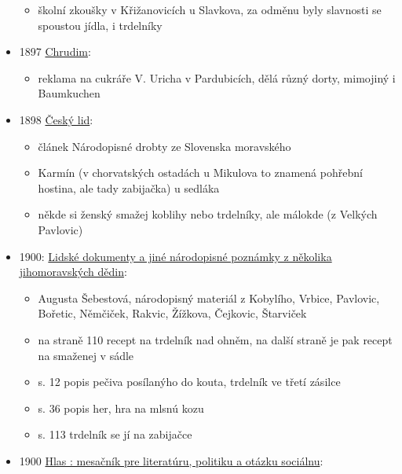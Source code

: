 \begin{itemize}
  \begin{itemize}
  \tightlist
  \item
    školní zkoušky v Křižanovicích u Slavkova, za odměnu byly slavnosti
    se spoustou jídla, i trdelníky
  \end{itemize}
\item
  1897
  \href{https://ceskadigitalniknihovna.cz/uuid/uuid:c3a426e0-2b81-11e7-a77b-001018b5eb5c}{Chrudim}:

  \begin{itemize}
  \tightlist
  \item
    reklama na cukráře V. Uricha v Pardubicích, dělá různý dorty,
    mimojiný i Baumkuchen
  \end{itemize}
\item
  1898
  \href{https://ceskadigitalniknihovna.cz/view/uuid:38bef4ba-03a2-433c-a4ed-a9914d68b1a5?page=uuid\%3A5c5ae01f-9a43-4111-b72b-1cfe6710f70a&fulltext=trdeln\%C3\%ADk\%20OR\%20trdeln\%C3\%ADky\%20OR\%20trdeln\%C3\%ADk\%C5\%AF&source=knav}{Český
  lid}:

  \begin{itemize}
  \tightlist
  \item
    článek Národopisné drobty ze Slovenska moravského
  \item
    Karmín (v chorvatských ostadách u Mikulova to znamená pohřební
    hostina, ale tady zabijačka) u sedláka
  \item
    někde si ženský smažej koblihy nebo trdelníky, ale málokde (z
    Velkých Pavlovic)
  \end{itemize}
\item
  1900:
  \href{https://ndk.cz/view/uuid:7d517d10-0583-11dd-85d4-000d606f5dc6?page=uuid\%3A445fd636-253c-4b04-b533-3b0a96e7e0b4}{
  Lidské dokumenty a jiné národopisné poznámky z několika jihomoravských
  dědin}:

  \begin{itemize}
  \tightlist
  \item
    Augusta Šebestová, národopisný materiál z Kobylího, Vrbice,
    Pavlovic, Bořetic, Němčiček, Rakvic, Žížkova, Čejkovic, Štarviček
  \item
    na straně 110 recept na trdelník nad ohněm, na další straně je pak
    recept na smaženej v sádle
  \item
    s. 12 popis pečiva posílanýho do kouta, trdelník ve třetí zásilce
  \item
    s. 36 popis her, hra na mlsnú kozu
  \item
    s. 113 trdelník se jí na zabijačce
  \end{itemize}
\item
  1900
  \href{https://dikda.snk.sk/uuid/uuid:7f57fb99-b746-49c2-9b31-a09b7a646c02}{Hlas
  : mesačník pre literatúru, politiku a otázku sociálnu}:


\end{itemize}
